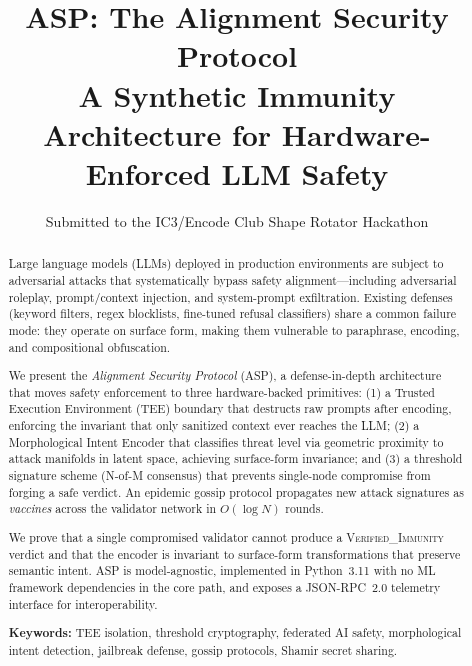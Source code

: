 \documentclass[sigconf,natbib=false]{acmart}
\begin{document}
\title{ASP: The Alignment Security Protocol\\
\large A Synthetic Immunity Architecture for Hardware-Enforced LLM Safety}

\author{Submitted to the IC3/Encode Club Shape Rotator Hackathon}

\begin{abstract}
Large language models (LLMs) deployed in production environments are subject
to adversarial attacks that systematically bypass safety alignment—including
adversarial roleplay, prompt/context injection, and system-prompt exfiltration.
Existing defenses (keyword filters, regex blocklists, fine-tuned refusal
classifiers) share a common failure mode: they operate on surface form, making
them vulnerable to paraphrase, encoding, and compositional obfuscation.

We present the \emph{Alignment Security Protocol} (ASP), a defense-in-depth
architecture that moves safety enforcement to three hardware-backed primitives:
(1) a Trusted Execution Environment (TEE) boundary that destructs raw prompts
after encoding, enforcing the invariant that only sanitized context ever reaches
the LLM; (2) a Morphological Intent Encoder that classifies threat level via
geometric proximity to attack manifolds in latent space, achieving surface-form
invariance; and (3) a threshold signature scheme (N-of-M consensus) that
prevents single-node compromise from forging a safe verdict.
An epidemic gossip protocol propagates new attack signatures as
\emph{vaccines} across the validator network in $O(\log N)$ rounds.

We prove that a single compromised validator cannot produce a
\textsc{Verified\_Immunity} verdict and that the encoder is invariant to
surface-form transformations that preserve semantic intent. ASP is
model-agnostic, implemented in Python~3.11 with no ML framework dependencies
in the core path, and exposes a JSON-RPC~2.0 telemetry interface for
interoperability.

\textbf{Keywords:} TEE isolation, threshold cryptography, federated AI safety,
morphological intent detection, jailbreak defense, gossip protocols,
Shamir secret sharing.
\end{abstract}

\maketitle
\end{document}
